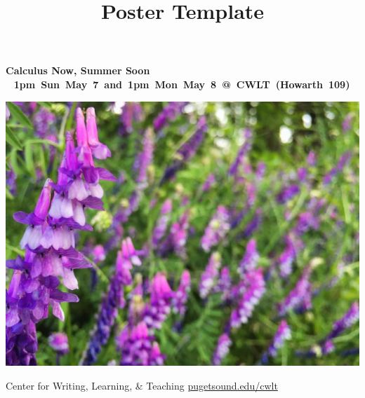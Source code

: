 \documentclass[12pt,letterpaper]{article}
\title{Poster Template}
\begin{document}
{\fontsize{40pt}{42pt}\bfseries\selectfont\color{HighlightColor}%
Calculus Now, Summer Soon
\\}%
~\hfill
{\LARGE\bfseries%
\mbox{1pm Sun May 7 and 1pm Mon May 8 @ CWLT (Howarth 109)}%
}

\vspace{-2ex}


\begin{large}
\justify
{\Large \par}

\end{large}

%

{\centering%
\includegraphics[width=\linewidth,trim={0 0 5cm 0},clip]{summer_flowers}%
\par}

\vfill

{\LARGE Center for Writing, Learning, \& Teaching}
\hfill
{\LARGE \url{pugetsound.edu/cwlt}}
\end{document}
